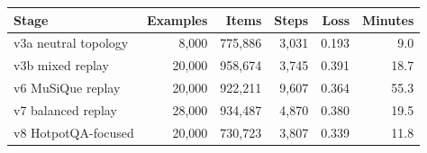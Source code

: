 \begin{tabular}{@{}lrrrrr@{}}
\toprule
Stage & Examples & Items & Steps & Loss & Minutes \\
\midrule
v3a neutral topology & 8,000 & 775,886 & 3,031 & 0.193 & 9.0 \\
v3b mixed replay & 20,000 & 958,674 & 3,745 & 0.391 & 18.7 \\
v6 MuSiQue replay & 20,000 & 922,211 & 9,607 & 0.364 & 55.3 \\
v7 balanced replay & 28,000 & 934,487 & 4,870 & 0.380 & 19.5 \\
v8 HotpotQA-focused & 20,000 & 730,723 & 3,807 & 0.339 & 11.8 \\
\bottomrule
\end{tabular}
